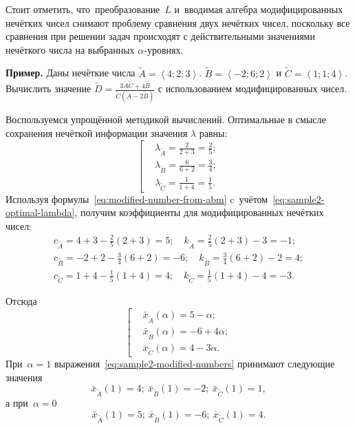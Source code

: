 Стоит отметить, что~преобразование~$L$ и~вводимая алгебра модифицированных нечётких чисел снимают проблему сравнения двух нечётких чисел, поскольку все сравнения при решении задач происходят с действительными значениями нечёткого числа на выбранных $\alpha$-уровнях.

\textbf{Пример.} Даны нечёткие числа $\tilde{A}=\left\langle 4;2;3 \right\rangle $. $\tilde{B}=\left\langle -2;6;2 \right\rangle $ и $\tilde{C}=\left\langle 1;1;4 \right\rangle $. Вычислить значение $\displaystyle \tilde{D}=\frac{3\tilde{A}\tilde{C}+4\tilde{B}}{\tilde{C}\left( \tilde{A}-2\tilde{B} \right)}$ с использованием модифицированных чисел.

Воспользуемся упрощённой методикой вычислений. Оптимальные в смысле сохранения нечёткой информации значения $\lambda$ равны:
\begin{equation}
\label{eq:sample2-optimal-lambda}
  \left[ \begin{aligned}
    & \lambda_{\tilde A}=\frac{2}{2+3}=\frac{2}{5}; \\ 
    & \lambda_{\tilde B}=\frac{6}{6+2}=\frac{3}{4}; \\ 
    & \lambda_{\tilde C}=\frac{1}{1+4}=\frac{1}{5}.
  \end{aligned} \right.
\end{equation}
Используя формулы~\eqref{eq:modified-number-from-abm} c~учётом~\eqref{eq:sample2-optimal-lambda}, получим коэффициенты для модифицированных нечётких чисел:
\begin{gather*}
  c_{\tilde A}=4+3-\frac{2}{5}\left( 2+3 \right)=5;\quad k_{\tilde A}=\frac{2}{5}\left( 2+3 \right)-3=-1; \\ 
  c_{\tilde B}=-2+2-\frac{3}{4}\left( 6+2 \right)=-6;\quad k_{\tilde B}=\frac{3}{4}\left( 6+2 \right)-2=4; \\ 
  c_{\tilde C}=1+4-\frac{1}{5}\left( 1+4 \right)=4;\quad k_{\tilde C}=\frac{1}{5}\left( 1+4 \right)-4=-3.
\end{gather*}

Отсюда
\begin{equation}
\label{eq:sample2-modified-numbers}
  \left[ \begin{aligned}
    & \bar{x}_{\tilde A}\left( \alpha  \right)=5-\alpha;  \\ 
    & \bar{x}_{\tilde B}\left( \alpha  \right)=-6+4\alpha;  \\ 
    & \bar{x}_{\tilde C}\left( \alpha  \right)=4-3\alpha.
  \end{aligned} \right.
\end{equation}
При~$\alpha=1$ выражения~\eqref{eq:sample2-modified-numbers} принимают следующие значения
\begin{equation*}
  \bar{x}_{\tilde A}\left( 1 \right)=4;\ \bar{x}_{\tilde B}\left( 1 \right)=-2;\ \bar{x}_{\tilde C}\left( 1 \right)=1,
\end{equation*}
а при~$\alpha=0$
\begin{equation*}
  \bar{x}_{\tilde A}\left( 1 \right)=5;\ \bar{x}_{\tilde B}\left( 1 \right)=-6;\ \bar{x}_{\tilde C}\left( 1 \right)=4.
\end{equation*}

